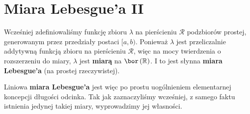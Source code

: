 \section{Miara Lebesgue'a II}

Wcześniej zdefiniowaliśmy funkcję zbioru $\lambda$ na pierścieniu $\mathcal{R}$ podzbiorów prostej, generowanym przez przedziały postaci $[a,b)$. Ponieważ $\lambda$ jest przeliczalnie addytywną funkcją zbioru na pierścieniu  $\mathcal{R}$, więc na mocy twierdzenia o rozszerzeniu do miary,  $\lambda$ jest \textbf{miarą} na  $\bor\left(\mathbb{R} \right) $. I to jest słynna \textbf{miara Lebesgue'a} (na prostej rzeczywistej).

Liniowa \textbf{miara Lebesgue'a} jest więc po prostu uogólnieniem elementarnej koncepcji długości odcinka. Tak jak zaznaczyliśmy wcześniej, z samego faktu istnienia jedynej takiej miary, wyprowadzimy jej własności.



